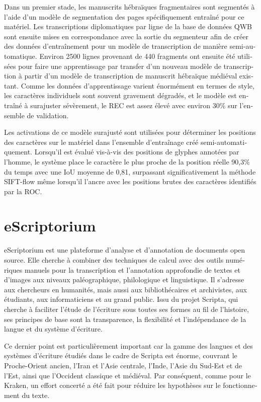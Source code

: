 \begin{french}
Dans un premier stade, les manuscrits hébraïques fragmentaires sont segmentés à
l'aide d'un modèle de segmentation des pages spécifiquement entraîné pour ce
matériel. Les transcriptions diplomatiques par ligne de la base de données QWB
sont ensuite mises en correspondance avec la sortie du segmenteur afin de créer
des données d'entraînement pour un modèle de transcription de manière
semi-automatique. Environ 2500 lignes provenant de 440 fragments ont ensuite
été utilisées pour faire une apprentissage par transfer d'un nouveau modèle de
transcription à partir d'un modèle de transcription de manuscrit hébraïque
médiéval existant.  Comme les données d'apprentissage varient énormément en
termes de style, les caractères individuels sont souvent gravement dégradés, et
le modèle est entraîné à surajuster sévèrement, le REC est assez élevé avec
environ 30\% sur l'ensemble de validation.

Les activations de ce modèle surajusté sont utilisées pour déterminer les
positions des caractères sur le matériel dans l'ensemble d'entraînage créé
semi-automati\-que\-ment. Lorsqu'il est évalué vis-à-vis des positions de glyphes
annotées par l'homme, le système place le caractère le plus proche de la
position réelle 90,3\% du temps avec une IoU moyenne de 0,81, surpassant
significativement la méthode SIFT-flow même lorsqu'il l'ancre avec les
positions brutes des caractères identifiés par la ROC.

\section{eScriptorium}

eScriptorium est une plateforme d'analyse et d'annotation de documents open
source. Elle cherche à combiner des techniques de calcul avec des outils
numériques manuels pour la transcription et l'annotation approfondie de textes
et d'images aux niveaux paléographique, philologique et linguistique. Il
s'adresse aux chercheurs en humanités, mais aussi aux bibliothécaires
et archivistes, aux étudiants, aux informaticiens et au grand public. Issu du
projet Scripta, qui cherche à faciliter l'étude de l'écriture sous toutes ses
formes au fil de l'histoire, ses principes de base sont la transparence, la
flexibilité et l'indépendance de la langue et du système d'écriture.

Ce dernier point est particulièrement important car la gamme des langues et des
systèmes d'écriture étudiés dans le cadre de Scripta est énorme, couvrant le
Proche-Orient ancien, l'Iran et l'Asie centrale, l'Inde, l'Asie du Sud-Est et
de l'Est, ainsi que l'Occident classique et médiéval. Par conséquent, comme
pour le Kraken, un effort concerté a été fait pour réduire les hypothèses sur
le fonctionnement du texte.


\end{french}

